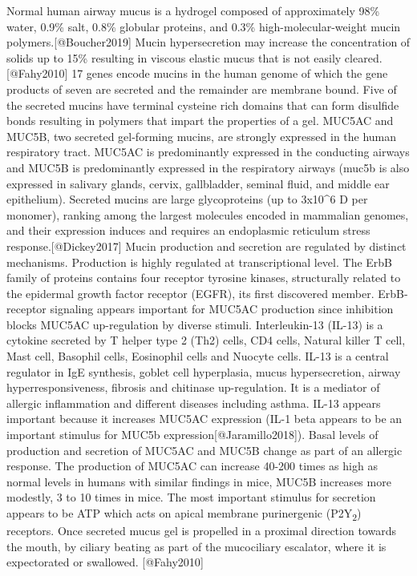 \documentclass[
]{article}
\begin{document}
Normal human airway mucus is a hydrogel composed of approximately 98\%
water, 0.9\% salt, 0.8\% globular proteins, and 0.3\%
high-molecular-weight mucin polymers.{[}@Boucher2019{]} Mucin
hypersecretion may increase the concentration of solids up to 15\%
resulting in viscous elastic mucus that is not easily
cleared.{[}@Fahy2010{]} 17 genes encode mucins in the human genome of
which the gene products of seven are secreted and the remainder are
membrane bound. Five of the secreted mucins have terminal cysteine rich
domains that can form disulfide bonds resulting in polymers that impart
the properties of a gel. MUC5AC and MUC5B, two secreted gel-forming
mucins, are strongly expressed in the human respiratory tract. MUC5AC is
predominantly expressed in the conducting airways and MUC5B is
predominantly expressed in the respiratory airways (muc5b is also
expressed in salivary glands, cervix, gallbladder, seminal fluid, and
middle ear epithelium). Secreted mucins are large glycoproteins (up to
3x10\^{}6 D per monomer), ranking among the largest molecules encoded in
mammalian genomes, and their expression induces and requires an
endoplasmic reticulum stress response.{[}@Dickey2017{]} Mucin production
and secretion are regulated by distinct mechanisms. Production is highly
regulated at transcriptional level. The ErbB family of proteins contains
four receptor tyrosine kinases, structurally related to the epidermal
growth factor receptor (EGFR), its first discovered member.
ErbB-receptor signaling appears important for MUC5AC production since
inhibition blocks MUC5AC up-regulation by diverse stimuli.
Interleukin-13 (IL-13) is a cytokine secreted by T helper type 2 (Th2)
cells, CD4 cells, Natural killer T cell, Mast cell, Basophil cells,
Eosinophil cells and Nuocyte cells. IL-13 is a central regulator in IgE
synthesis, goblet cell hyperplasia, mucus hypersecretion, airway
hyperresponsiveness, fibrosis and chitinase up-regulation. It is a
mediator of allergic inflammation and different diseases including
asthma. IL-13 appears important because it increases MUC5AC expression
(IL-1 beta appears to be an important stimulus for MUC5b
expression{[}@Jaramillo2018{]}). Basal levels of production and
secretion of MUC5AC and MUC5B change as part of an allergic response.
The production of MUC5AC can increase 40-200 times as high as normal
levels in humans with similar findings in mice, MUC5B increases more
modestly, 3 to 10 times in mice. The most important stimulus for
secretion appears to be ATP which acts on apical membrane purinergenic
(P2Y\textsubscript{2}) receptors. Once secreted mucus gel is propelled
in a proximal direction towards the mouth, by ciliary beating as part of
the mucociliary escalator, where it is expectorated or swallowed.
{[}@Fahy2010{]}
\end{document}
